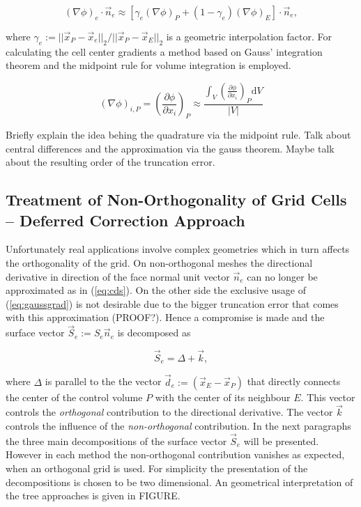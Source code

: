     \begin{displaymath}
      \left(\nabla \phi\right)_e \cdot \vec{n}_e 
      \approx 
      \left[\gamma_e \left(\nabla \phi \right)_P + (1-\gamma_e) \left(\nabla \phi \right)_E \right] \cdot \vec{n}_e,
    \end{displaymath}

    where \( \gamma_e := {||\vec{x}_P - \vec{x}_e||_2}/{||\vec{x}_P - \vec{x}_E||_2}\) is a geometric interpolation factor. For calculating the cell center gradients a method based on Gauss' integration theorem and the midpoint rule for volume integration is employed.

    \begin{equation}
      \label{eq:gaussgrad}
      \left( \nabla \phi \right)_{i,P}
      =
      \left( \frac{\partial \phi}{\partial x_i}\right)_P
      \approx
      \frac{\int_V\left(\frac{\partial \phi}{\partial x_i}\right)_P\mathrm{d}V}{|V|}
    \end{equation}

    Briefly explain the idea behing the quadrature via the midpoint rule. Talk about central differences and the approximation via the gauss theorem. Maybe talk about the resulting order of the truncation error. 

    \subsection{Treatment of Non-Orthogonality of Grid Cells -- Deferred Correction Approach}

    Unfortunately real applications involve complex geometries which in turn affects the orthogonality of the grid. On non-orthogonal meshes the directional derivative in direction of the face normal unit vector \(\vec{n}_e\) can no longer be approximated as in (\ref{eq:cds}). On the other side the exclusive usage of (\ref{eq:gaussgrad}) is not desirable due to the bigger truncation error that comes with this approximation (PROOF?). Hence a compromise is made and the surface vector \(\vec{S}_e := S_e \vec{n}_e\) is decomposed as

    \begin{equation}
      \vec{S}_e = \Delta + \vec{k},
    \end{equation}

    where \(\Delta\) is parallel to the the vector \(\vec{d}_e := \left(\vec{x}_E - \vec{x}_P\right)\) that directly connects the center of the control volume \(P\) with the center of its neighbour \(E\). This vector controls the \textit{orthogonal} contribution to the directional derivative. The vector \(\vec{k}\) controls the influence of the \textit{non-orthogonal} contribution. In the next paragraphs the three main decompositions of the surface vector \(\vec{S}_e\) will be presented. However in each method the non-orthogonal contribution vanishes as expected, when an orthogonal grid is used. For simplicity the presentation of the decompositions is chosen to be two dimensional. An geometrical interpretation of the tree approaches is given in FIGURE.


